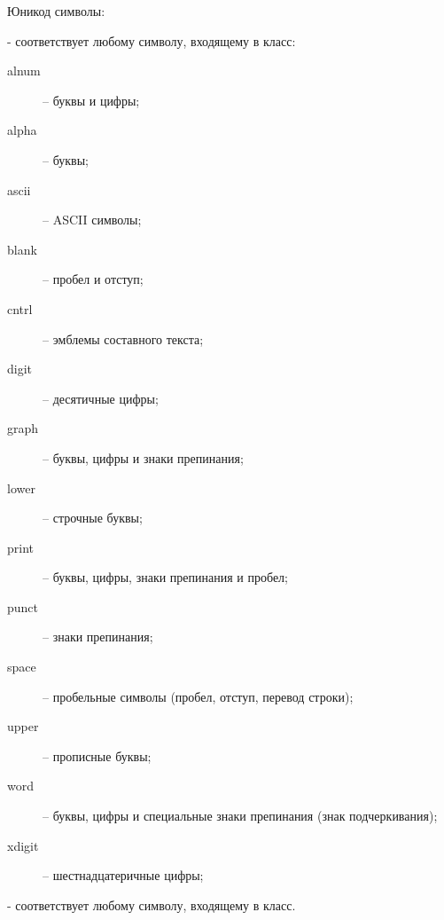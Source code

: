 \begin{keylist}{Юникод символы:}

\firstkey{[[:класс:]]} -  соответствует любому символу, входящему в класс:
  \begin{description}
    \item[alnum]  – буквы и цифры;
    \item[alpha]  – буквы;
    \item[ascii]  – ASCII символы;
    \item[blank]  – пробел и отступ;
    \item[cntrl]  – эмблемы составного текста;
    \item[digit]  – десятичные цифры;
    \item[graph]  – буквы, цифры и знаки препинания;
    \item[lower]  – строчные буквы;
    \item[print]  – буквы, цифры, знаки препинания и пробел;
    \item[punct]  – знаки препинания;
    \item[space]  – пробельные символы (пробел, отступ, перевод строки);
    \item[upper]  – прописные буквы;
    \item[word]   – буквы, цифры и специальные знаки препинания (знак подчеркивания);
    \item[xdigit] – шестнадцатеричные цифры;
  \end{description}

 - соответствует любому символу, входящему в класс.


\end{keylist}
